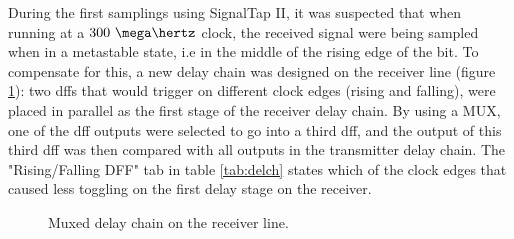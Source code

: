 \documentclass[main.tex]{subfiles}
\begin{document}

During the first samplings using SignalTap II, it was suspected that when running at a $300~\mega\hertz$ clock, the received signal were being sampled when in a metastable state, i.e in the middle of the rising edge of the bit. To compensate for this, a new delay chain was designed on the receiver line (figure \ref{fig:rxpardelay}): two \glspl{dff} that would trigger on different clock edges (rising and falling), were placed in parallel as the first stage of the receiver delay chain. By using a MUX, one of the \gls{dff} outputs were selected to go into a third \gls{dff}, and the output of this third \gls{dff} was then compared with all outputs in the transmitter delay chain. The "Rising/Falling DFF" tab in table \ref{tab:delch} states which of the clock edges that caused less toggling on the first delay stage on the receiver. \\


\begin{figure}
    \centering
    \resizebox{0.7\linewidth}{!}{}
    \caption{Muxed delay chain on the receiver line.}
     \label{fig:rxpardelay}
\end{figure}
\end{document}
